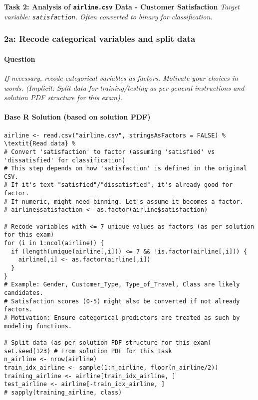 \documentclass[12pt,a4paper]{article}
\newcommand{\Robject}[1]{\texttt{#1}} %
\newcommand{\Rcode}[1]{\texttt{#1}} %
\begin{document}
\vspace{1em}
\textbf{\Large Task 2: Analysis of \Robject{airline.csv} Data - Customer Satisfaction}
\vspace{0.5em}
    \textit{Target variable: \Rcode{satisfaction}. Often converted to binary for classification.}

    \subsubsection{2a: Recode categorical variables and split data}
        \paragraph{Question}
        \textit{If necessary, recode categorical variables as factors. Motivate your choices in words. (Implicit: Split data for training/testing as per general instructions and solution PDF structure for this exam).}
        \paragraph{Base R Solution (based on solution PDF)}
\begin{lstlisting}
airline <- read.csv("airline.csv", stringsAsFactors = FALSE) % \textit{Read data} %
# Convert 'satisfaction' to factor (assuming 'satisfied' vs 'dissatisfied' for classification)
# This step depends on how 'satisfaction' is defined in the original CSV.
# If it's text "satisfied"/"dissatisfied", it's already good for factor.
# If numeric, might need binning. Let's assume it becomes a factor.
# airline$satisfaction <- as.factor(airline$satisfaction)

# Recode variables with <= 7 unique values as factors (as per solution for this exam)
for (i in 1:ncol(airline)) {
  if (length(unique(airline[,i])) <= 7 && !is.factor(airline[,i])) {
    airline[,i] <- as.factor(airline[,i])
  }
}
# Example: Gender, Customer_Type, Type_of_Travel, Class are likely candidates.
# Satisfaction scores (0-5) might also be converted if not already factors.
# Motivation: Ensure categorical predictors are treated as such by modeling functions.

# Split data (as per solution PDF structure for this exam)
set.seed(123) # From solution PDF for this task
n_airline <- nrow(airline)
train_idx_airline <- sample(1:n_airline, floor(n_airline/2))
training_airline <- airline[train_idx_airline, ]
test_airline <- airline[-train_idx_airline, ]
# sapply(training_airline, class)
\end{lstlisting}
\end{document}
